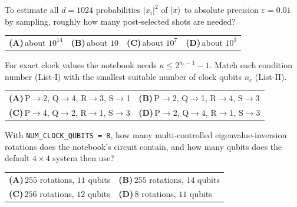 \documentclass[11pt,a4paper]{article}
\newcommand{\optlabel}[1]{\textbf{(#1)}}
\newenvironment{qitem}[1]{\begin{list}{}{\setlength{\leftmargin}{3.3em}\setlength{\labelwidth}{3.1em}%
  \setlength{\labelsep}{0.2em}\setlength{\topsep}{3pt}\setlength{\parsep}{3pt}}\item[\textbf{Q.#1}\hfill]}{\end{list}}
\newcommand{\qsep}{\par\vspace{2pt}{\color{black!15}\hrule}\vspace{4pt}}
\begin{document}
\begin{qitem}{63}
To estimate all $d = 1024$ probabilities $|x_i|^2$ of $\ket x$ to absolute precision $\varepsilon = 0.01$ by sampling, roughly how many post-selected shots are needed?
\par\smallskip\noindent\begin{tabularx}{\linewidth}{@{}*{4}{L}@{}}
\optlabel{A}\,about $10^{14}$ & \optlabel{B}\,about $10$ & \optlabel{C}\,about $10^7$ & \optlabel{D}\,about $10^3$
\end{tabularx}
\end{qitem}
\qsep

\begin{qitem}{64}
For exact clock values the notebook needs $\kappa \le 2^{n_c - 1} - 1$. Match each condition number (List-I) with the smallest suitable number of clock qubits $n_c$
(List-II).
\par\smallskip{}
\par\smallskip\noindent\begin{tabularx}{\linewidth}{@{}*{2}{L}@{}}
\optlabel{A}\,P$\to$2, Q$\to$4, R$\to$3, S$\to$1 & \optlabel{B}\,P$\to$2, Q$\to$1, R$\to$4, S$\to$3 \\[3pt]
\optlabel{C}\,P$\to$4, Q$\to$2, R$\to$1, S$\to$3 & \optlabel{D}\,P$\to$2, Q$\to$4, R$\to$1, S$\to$3
\end{tabularx}
\end{qitem}
\qsep

\begin{qitem}{65}
With \texttt{NUM\_CLOCK\_QUBITS = 8}, how many multi-controlled eigenvalue-inversion rotations does the notebook's circuit contain, and how many qubits does the
default $4\times4$ system then use?
\par\smallskip\noindent\begin{tabularx}{\linewidth}{@{}*{2}{L}@{}}
\optlabel{A}\,$255$ rotations, $11$ qubits & \optlabel{B}\,$255$ rotations, $14$ qubits \\[3pt]
\optlabel{C}\,$256$ rotations, $12$ qubits & \optlabel{D}\,$8$ rotations, $11$ qubits
\end{tabularx}
\end{qitem}
\qsep
\end{document}
